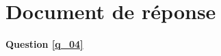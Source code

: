 %
%
%
%
%
%
%
%
%
%
%
%
%
%
%
%
%
\ifprof
\else

\newpage 
\section*{Document de réponse}

\textbf{Question \ref{q_04}}

